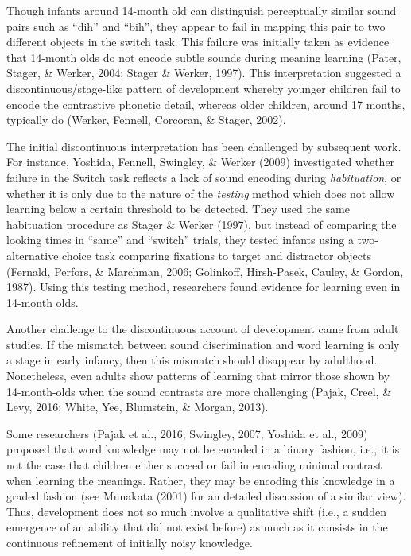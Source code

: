 \documentclass[english,,man]{apa6}
\begin{document}
Though infants around 14-month old can distinguish perceptually similar sound pairs such as \enquote{dih} and \enquote{bih}, they appear to fail in mapping this pair to two different objects in the switch task. This failure was initially taken as evidence that 14-month olds do not encode subtle sounds during meaning learning (Pater, Stager, \& Werker, 2004; Stager \& Werker, 1997). This interpretation suggested a discontinuous/stage-like pattern of development whereby younger children fail to encode the contrastive phonetic detail, whereas older children, around 17 months, typically do (Werker, Fennell, Corcoran, \& Stager, 2002).

The initial discontinuous interpretation has been challenged by subsequent work. For instance, Yoshida, Fennell, Swingley, \& Werker (2009) investigated whether failure in the Switch task reflects a lack of sound encoding during \emph{habituation}, or whether it is only due to the nature of the \emph{testing} method which does not allow learning below a certain threshold to be detected. They used the same habituation procedure as Stager \& Werker (1997), but instead of comparing the looking times in \enquote{same} and \enquote{switch} trials, they tested infants using a two-alternative choice task comparing fixations to target and distractor objects (Fernald, Perfors, \& Marchman, 2006; Golinkoff, Hirsh-Pasek, Cauley, \& Gordon, 1987). Using this testing method, researchers found evidence for learning even in 14-month olds.

Another challenge to the discontinuous account of development came from adult studies. If the mismatch between sound discrimination and word learning is only a stage in early infancy, then this mismatch should disappear by adulthood. Nonetheless, even adults show patterns of learning that mirror those shown by 14-month-olds when the sound contrasts are more challenging (Pajak, Creel, \& Levy, 2016; White, Yee, Blumstein, \& Morgan, 2013).

Some researchers (Pajak et al., 2016; Swingley, 2007; Yoshida et al., 2009) proposed that word knowledge may not be encoded in a binary fashion, i.e., it is not the case that children either succeed or fail in encoding minimal contrast when learning the meanings. Rather, they may be encoding this knowledge in a graded fashion (see Munakata (2001) for an detailed discussion of a similar view). Thus, development does not so much involve a qualitative shift (i.e., a sudden emergence of an ability that did not exist before) as much as it consists in the continuous refinement of initially noisy knowledge.
\end{document}
